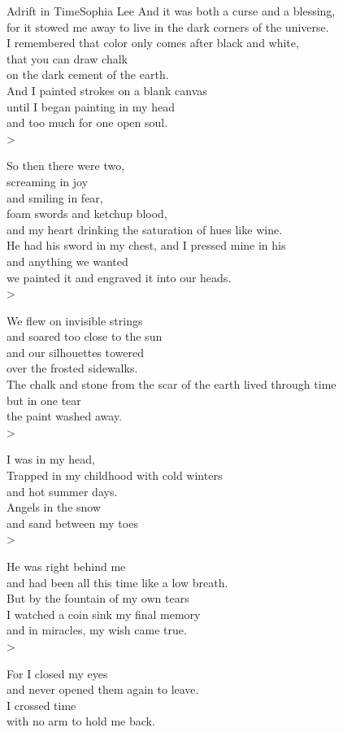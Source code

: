 \begin{poetry}{Adrift in Time}{Sophia Lee}
And it was both a curse and a blessing,\\
\tab{}for it stowed me away to live in the dark corners of the universe.\\
I remembered that color only comes after black and white,\\
\tab{}that you can draw chalk\\
on the dark cement of the earth.\\
\tab{}And I painted strokes on a blank canvas\\
until I began painting in my head\\
\tab{}and too much for one open soul.\\>

So then there were two,\\
\tab{}screaming in joy\\
and smiling in fear,\\
\tab{}foam swords and ketchup blood,\\
and my heart drinking the saturation of hues like wine.\\
\tab{}He had his sword in my chest, and I pressed mine in his\\
and anything we wanted\\
\tab{}we painted it and engraved it into our heads.\\>

We flew on invisible strings\\
\tab{}and soared too close to the sun\\
and our silhouettes towered\\
\tab{}over the frosted sidewalks.\\
The chalk and stone from the scar of the earth lived through time\\
\tab{}but in one tear\\
the paint washed away.\\>

I was in my head,\\
\tab{}Trapped in my childhood with cold winters \\
and hot summer days.\\
\tab{}Angels in the snow\\
and sand between my toes\\>

He was right behind me\\
\tab{}and had been all this time like a low breath.\\
But by the fountain of my own tears\\
\tab{}I watched a coin sink my final memory\\
and in miracles, my wish came true.\\>

For I closed my eyes\\
\tab{}and never opened them again to leave.\\
I crossed time\\
\tab{}with no arm to hold me back.
\end{poetry}

